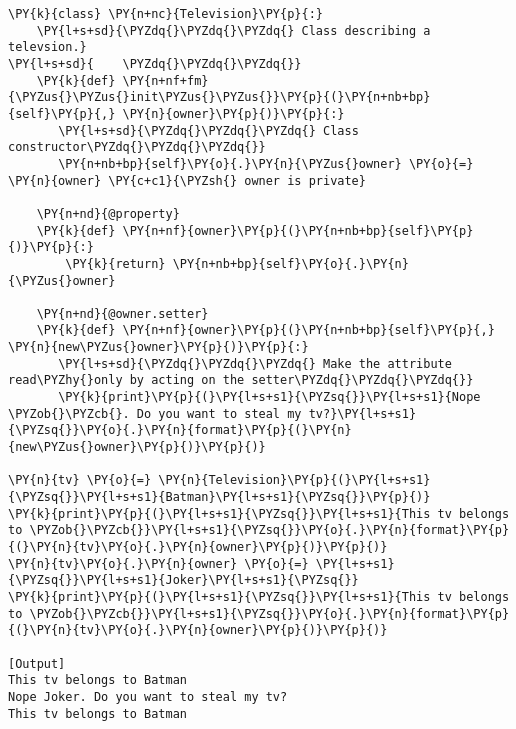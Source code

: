 \begin{Verbatim}[label=\makebox{\url{https://github.com/lucabaldini/cmepda/tree/master/slides/latex/snippets/class\_tv\_encapsulation\_properties.py}},commandchars=\\\{\}]
\PY{k}{class} \PY{n+nc}{Television}\PY{p}{:}
    \PY{l+s+sd}{\PYZdq{}\PYZdq{}\PYZdq{} Class describing a televsion.}
\PY{l+s+sd}{    \PYZdq{}\PYZdq{}\PYZdq{}}
    \PY{k}{def} \PY{n+nf+fm}{\PYZus{}\PYZus{}init\PYZus{}\PYZus{}}\PY{p}{(}\PY{n+nb+bp}{self}\PY{p}{,} \PY{n}{owner}\PY{p}{)}\PY{p}{:}
       \PY{l+s+sd}{\PYZdq{}\PYZdq{}\PYZdq{} Class constructor\PYZdq{}\PYZdq{}\PYZdq{}}
       \PY{n+nb+bp}{self}\PY{o}{.}\PY{n}{\PYZus{}owner} \PY{o}{=} \PY{n}{owner} \PY{c+c1}{\PYZsh{} owner is private}
    
    \PY{n+nd}{@property}
    \PY{k}{def} \PY{n+nf}{owner}\PY{p}{(}\PY{n+nb+bp}{self}\PY{p}{)}\PY{p}{:}
        \PY{k}{return} \PY{n+nb+bp}{self}\PY{o}{.}\PY{n}{\PYZus{}owner}

    \PY{n+nd}{@owner.setter}
    \PY{k}{def} \PY{n+nf}{owner}\PY{p}{(}\PY{n+nb+bp}{self}\PY{p}{,} \PY{n}{new\PYZus{}owner}\PY{p}{)}\PY{p}{:}
       \PY{l+s+sd}{\PYZdq{}\PYZdq{}\PYZdq{} Make the attribute read\PYZhy{}only by acting on the setter\PYZdq{}\PYZdq{}\PYZdq{}}
       \PY{k}{print}\PY{p}{(}\PY{l+s+s1}{\PYZsq{}}\PY{l+s+s1}{Nope \PYZob{}\PYZcb{}. Do you want to steal my tv?}\PY{l+s+s1}{\PYZsq{}}\PY{o}{.}\PY{n}{format}\PY{p}{(}\PY{n}{new\PYZus{}owner}\PY{p}{)}\PY{p}{)}
 
\PY{n}{tv} \PY{o}{=} \PY{n}{Television}\PY{p}{(}\PY{l+s+s1}{\PYZsq{}}\PY{l+s+s1}{Batman}\PY{l+s+s1}{\PYZsq{}}\PY{p}{)}
\PY{k}{print}\PY{p}{(}\PY{l+s+s1}{\PYZsq{}}\PY{l+s+s1}{This tv belongs to \PYZob{}\PYZcb{}}\PY{l+s+s1}{\PYZsq{}}\PY{o}{.}\PY{n}{format}\PY{p}{(}\PY{n}{tv}\PY{o}{.}\PY{n}{owner}\PY{p}{)}\PY{p}{)} 
\PY{n}{tv}\PY{o}{.}\PY{n}{owner} \PY{o}{=} \PY{l+s+s1}{\PYZsq{}}\PY{l+s+s1}{Joker}\PY{l+s+s1}{\PYZsq{}}
\PY{k}{print}\PY{p}{(}\PY{l+s+s1}{\PYZsq{}}\PY{l+s+s1}{This tv belongs to \PYZob{}\PYZcb{}}\PY{l+s+s1}{\PYZsq{}}\PY{o}{.}\PY{n}{format}\PY{p}{(}\PY{n}{tv}\PY{o}{.}\PY{n}{owner}\PY{p}{)}\PY{p}{)}

[Output]
This tv belongs to Batman
Nope Joker. Do you want to steal my tv?
This tv belongs to Batman
\end{Verbatim}